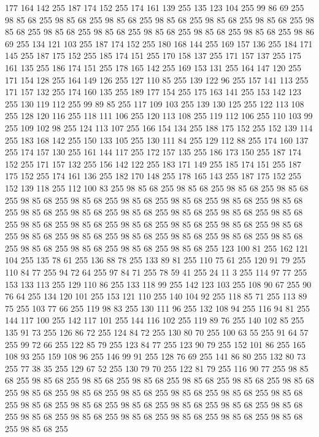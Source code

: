 177 164 142 255 187 174 152 255 174 161 139 255 135 123 104 255 99 86 69 255 98 85 68 255 98 85 68 255 98 85 68 255 98 85 68 255 98 85 68 255 98 85 68 255 98 85 68 255 98 85 68 255 98 85 68 255 98 85 68 255 98 85 68 255 98 85 68 255 98 86 69 255 134 121 103 255 187 174 152 255 180 168 144 255 169 157 136 255 184 171 145 255 187 175 152 255 185 174 151 255 170 158 137 255 171 157 137 255 175 161 135 255 186 174 151 255 178 165 142 255 169 153 131 255 164 147 120 255 171 154 128 255 164 149 126 255 127 110 85 255 139 122 96 255 157 141 113 255 171 157 132 255 174 160 135 255 189 177 154 255 175 163 141 255 153 142 123 255 130 119 112 255 99 89 85 255 117 109 103 255 139 130 125 255 122 113 108 255 128 120 116 255 118 111 106 255 120 113 108 255 119 112 106 255 110 103 99 255 109 102 98 255 124 113 107 255 166 154 134 255 188 175 152 255 152 139 114 255 183 168 142 255 150 133 105 255 130 111 84 255 129 112 88 255 174 160 137 255 174 157 130 255 161 144 117 255
172 157 135 255 186 173 150 255 187 174 152 255 171 157 132 255 156 142 122 255 183 171 149 255 185 174 151 255 187 175 152 255 174 161 136 255 182 170 148 255 178 165 143 255 187 175 152 255 152 139 118 255 112 100 83 255 98 85 68 255 98 85 68 255 98 85 68 255 98 85 68 255 98 85 68 255 98 85 68 255 98 85 68 255 98 85 68 255 98 85 68 255 98 85 68 255 98 85 68 255 98 85 68 255 98 85 68 255 98 85 68 255 98 85 68 255 98 85 68 255 98 85 68 255 98 85 68 255 98 85 68 255 98 85 68 255 98 85 68 255 98 85 68 255 98 85 68 255 98 85 68 255 98 85 68 255 98 85 68 255 98 85 68 255 98 85 68 255 98 85 68 255 98 85 68 255 98 85 68 255 98 85 68 255 123 100 81 255 162 121 104 255 135 78 61 255 136 88 78 255 133 89 81 255 110 75 61 255 120 91 79 255 110 84 77 255 94 72 64 255 97 84 71 255 78 59 41 255 24 11 3 255 114 97 77 255 153 133 113 255 129 110 86 255 133 118 99 255 142 123 103 255 108 90 67 255
90 76 64 255 134 120 101 255 153 121 110 255 140 104 92 255 118 85 71 255 113 89 75 255 103 77 66 255 119 98 83 255 130 111 96 255 132 108 94 255 116 94 81 255 144 117 100 255 142 117 101 255 144 116 102 255 119 89 76 255 140 102 85 255 135 91 73 255 126 86 72 255 124 84 72 255 130 80 70 255 100 63 55 255 91 64 57 255 99 72 66 255 122 85 79 255 123 84 77 255 123 90 79 255 152 101 86 255 165 108 93 255 159 108 96 255 146 99 91 255 128 76 69 255 141 86 80 255 132 80 73 255 77 38 35 255 129 67 52 255 130 79 70 255 122 81 79 255 116 90 77 255 98 85 68 255 98 85 68 255 98 85 68 255 98 85 68 255 98 85 68 255 98 85 68 255 98 85 68 255 98 85 68 255 98 85 68 255 98 85 68 255 98 85 68 255 98 85 68 255 98 85 68 255 98 85 68 255 98 85 68 255 98 85 68 255 98 85 68 255 98 85 68 255 98 85 68 255 98 85 68 255 98 85 68 255 98 85 68 255 98 85 68 255 98 85 68 255 98 85 68 255 98 85 68 255
